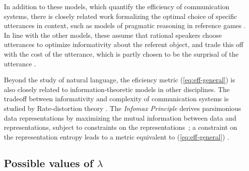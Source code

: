 \documentclass[10pt,twoside,lineno]{article}
\newcommand{\key}[1]{\textbf{#1}}
\begin{document}
In addition to these models, which quantify the efficiency of communication systems, there is closely related work formalizing the optimal choice of specific utterances in context, such as models of pragmatic reasoning in reference games \cite{frank2012predicting,goodman2013knowledge, kao2014nonliteral}.
In line with the other models, these assume that rational speakers choose utterances to optimize informativity about the referent object, and trade this off with the cost of the utterance, which is partly chosen to be the surprisal of the utterance \cite{bennett2018extremely}.


Beyond the study of natural language, the eficiency metric (\ref{eq:eff-general}) is also closely related to information-theoretic models in other disciplines.
The tradeoff between informativity and complexity of communication systems is studied by Rate-distortion theory \cite{shannon1948mathematical, berger1971rate}.
The \emph{Infomax Principle} derives parsimonious data representations by maximizing the mutual information between data and representations, subject to constraints on the representations~\cite{linsker1988self}; a constraint on the representation entropy leads to a metric equivalent to (\ref{eq:eff-general}) \cite{friston2010free}. 







\subsection{Possible values of $\lambda$}\label{sec:lambda}
\end{document}
